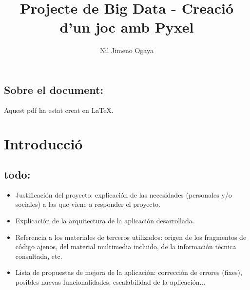 

\title{Projecte de Big Data - Creaci\'o d'un joc amb Pyxel}
\author{Nil Jimeno Ogaya}




\maketitle

\subsection*{Sobre el document:}

Aquest pdf ha estat creat en \LaTeX.

\section{Introducci\'o}

\subsection*{todo:}
\begin{itemize}
\item{Justificación del proyecto: explicación de las necesidades (personales y/o
sociales) a las que viene a responder el proyecto.}
\item{Explicación de la arquitectura de la aplicación desarrollada.}
\item{Referencia a los materiales de terceros utilizados: origen de los fragmentos de
código ajenos, del material multimedia incluido, de la información técnica
consultada, etc.}
\item{Lista de propuestas de mejora de la aplicación: corrección de errores (fixes),
posibles nuevas funcionalidades, escalabilidad de la aplicación...}
\end{itemize}





